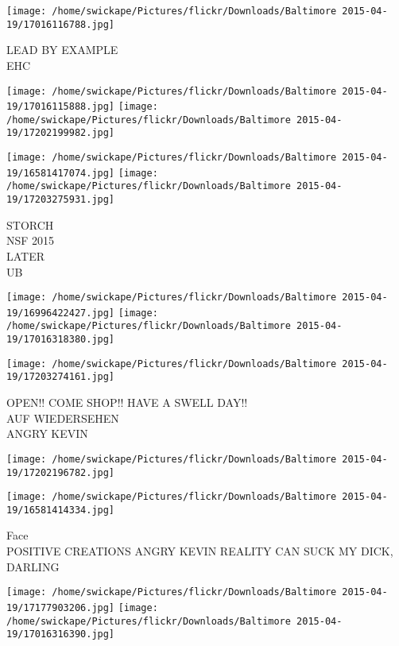 \documentclass[10pt,letterpaper]{article}
\begin{document}
\vspace{0.25in}
\texttt{[image: /home/swickape/Pictures/flickr/Downloads/Baltimore 2015-04-19/17016116788.jpg]}

LEAD BY EXAMPLE\\
EHC\\
\pagebreak

\texttt{[image: /home/swickape/Pictures/flickr/Downloads/Baltimore 2015-04-19/17016115888.jpg]}
\texttt{[image: /home/swickape/Pictures/flickr/Downloads/Baltimore 2015-04-19/17202199982.jpg]}

\texttt{[image: /home/swickape/Pictures/flickr/Downloads/Baltimore 2015-04-19/16581417074.jpg]}
\texttt{[image: /home/swickape/Pictures/flickr/Downloads/Baltimore 2015-04-19/17203275931.jpg]}

STORCH\\
NSF 2015\\
LATER\\
UB\\
\pagebreak

\texttt{[image: /home/swickape/Pictures/flickr/Downloads/Baltimore 2015-04-19/16996422427.jpg]}
\texttt{[image: /home/swickape/Pictures/flickr/Downloads/Baltimore 2015-04-19/17016318380.jpg]}

\texttt{[image: /home/swickape/Pictures/flickr/Downloads/Baltimore 2015-04-19/17203274161.jpg]}

OPEN!! COME SHOP!! HAVE A SWELL DAY!!\\
AUF WIEDERSEHEN\\
ANGRY KEVIN\\
\pagebreak

\texttt{[image: /home/swickape/Pictures/flickr/Downloads/Baltimore 2015-04-19/17202196782.jpg]}

\vspace{0.25in}
\texttt{[image: /home/swickape/Pictures/flickr/Downloads/Baltimore 2015-04-19/16581414334.jpg]}

Face\\
POSITIVE CREATIONS ANGRY KEVIN REALITY CAN SUCK MY DICK, DARLING\\
\pagebreak

\texttt{[image: /home/swickape/Pictures/flickr/Downloads/Baltimore 2015-04-19/17177903206.jpg]}
\texttt{[image: /home/swickape/Pictures/flickr/Downloads/Baltimore 2015-04-19/17016316390.jpg]}
\end{document}
